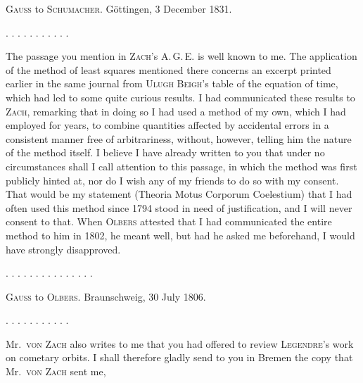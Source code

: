\clearpage
{}
\begin{center}
\textsc{Gauss} to \textsc{Schumacher}. Göttingen, 3 December 1831.
\end{center}

\begin{center}
. . . . . . . . . . .
\end{center}

The passage you mention in \textsc{Zach}'s A.\,G.\,E. is well known to me. The application of the method of least squares mentioned there concerns an excerpt printed earlier in the same journal from \textsc{Ulugh Beigh}'s table of the equation of time, which had led to some quite curious results. I had communicated these results to \textsc{Zach}, remarking that in doing so I had used a method of my own, which I had employed for years, to combine quantities affected by accidental errors in a consistent manner free of arbitrariness, without, however, telling him the nature of the method itself. I believe I have already written to you that under no circumstances shall I call attention to this passage, in which the method was first publicly hinted at, nor do I wish any of my friends to do so with my consent. That would be  my statement (Theoria Motus Corporum Coelestium) that I had often used this method since 1794 stood in need of justification, and I will never consent to that. When \textsc{Olbers} attested that I had communicated the entire method to him in 1802, he meant well, but had he asked me beforehand, I would have strongly disapproved.

\begin{center}
. . . . . . . . . . . . . . .
\end{center}

\begin{center}
\textsc{Gauss} to \textsc{Olbers}. Braunschweig, 30 July 1806.
\end{center}

\begin{center}
. . . . . . . . . . .
\end{center}

Mr.\ \textsc{von Zach} also writes to me that you had offered to review \textsc{Legendre}'s work on cometary orbits. I shall therefore gladly send to you in Bremen the copy that Mr.\ \textsc{von Zach} sent me,
